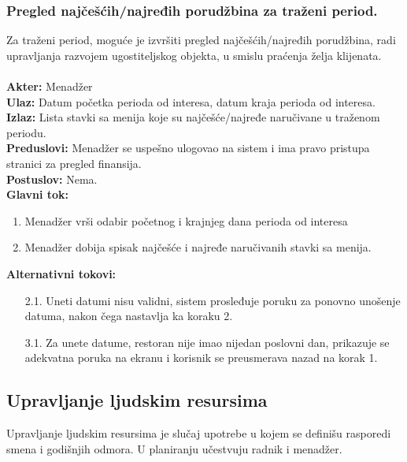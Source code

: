 \documentclass{article}
\begin{document}
\subsubsection{Pregled najčešćih/najređih porudžbina za traženi period.}
Za traženi period, moguće je izvršiti pregled najčešćih/najređih porudžbina, radi upravljanja razvojem ugostiteljskog objekta, u smislu praćenja želja klijenata.\\\\
\textbf{Akter:} Menadžer\\
\textbf{Ulaz:} Datum početka perioda od interesa, datum kraja perioda od interesa.\\
\textbf{Izlaz:} Lista stavki sa menija koje su najčešće/najređe naručivane u traženom periodu.\\
\textbf{Preduslovi:} Menadžer se uspešno ulogovao na sistem i ima pravo pristupa stranici za pregled finansija.\\
\textbf{Postuslov:} Nema.\\
\textbf{Glavni tok:}
\begin{enumerate}
\item Menadžer vrši odabir početnog i krajnjeg dana perioda od interesa
\item Menadžer dobija spisak najčešće i najređe naručivanih stavki sa menija.
\end{enumerate}
\textbf{Alternativni tokovi:}\\
\begin{itemize}
\item [2.1.] Uneti datumi nisu validni, sistem prosleđuje poruku za ponovno unošenje datuma, nakon čega nastavlja ka koraku 2.
\item [3.1.] Za unete datume, restoran nije imao nijedan poslovni dan, prikazuje se adekvatna poruka na ekranu i korisnik se preusmerava nazad na korak 1.
\end{itemize}


\subsection{Upravljanje ljudskim resursima}
Upravljanje ljudskim resursima je slučaj upotrebe u kojem se definišu rasporedi smena i godišnjih odmora. U planiranju učestvuju radnik i menadžer.
\end{document}
